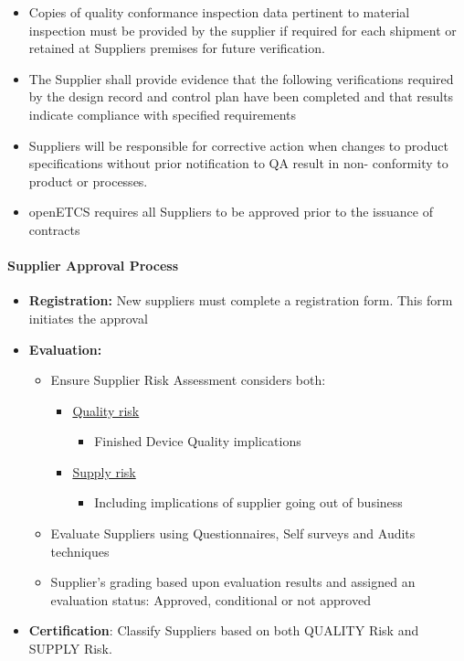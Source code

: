 \documentclass{template/openetcs_article}
\begin{document}
\begin{itemize}
\item Copies of quality conformance inspection data pertinent to material inspection must be provided by the supplier if required for each shipment or retained at Suppliers premises for future verification.
\item The Supplier shall provide evidence that the following verifications required by the design record and control plan have been completed and that results indicate compliance with specified requirements
\item Suppliers will be responsible for corrective action when changes to product specifications without prior notification to QA result in non- conformity to product or processes.
\item openETCS requires all Suppliers to be approved prior to the issuance of contracts
\end{itemize}

\paragraph{Supplier Approval Process}
\begin{itemize}
\item \textbf{Registration:} New suppliers must complete a registration form. This form initiates the approval 
\item \textbf{Evaluation:} 
\begin{itemize}
\item Ensure Supplier Risk Assessment considers both:
\begin{itemize}
\item \underline{Quality risk}
\begin{itemize}
\item Finished Device Quality implications
\end{itemize}
\item \underline{Supply risk}
\begin{itemize}
\item Including implications of supplier going out of business
\end{itemize}
\end{itemize}
\item Evaluate Suppliers using Questionnaires, Self surveys and Audits techniques
\item Supplier’s grading based upon evaluation results and assigned an evaluation status: Approved, conditional or not approved
\end{itemize}
\item \textbf{Certification}: Classify Suppliers based on both QUALITY Risk and SUPPLY Risk.
\end{itemize}
\end{document}
